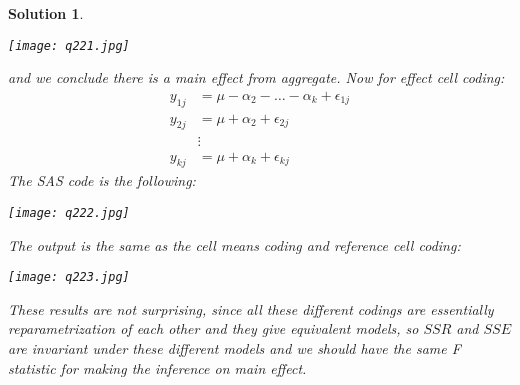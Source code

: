 \documentclass[11pt]{article}
\newtheorem{sol}{Solution}
\begin{document}
\begin{sol}
\begin{center}
		\texttt{[image: q221.jpg]}
	\end{center}
	and we conclude there is a main effect from aggregate.\vskip 2mm
	Now for effect cell coding:
	\begin{align*}
		y_{1j} &= \mu - \alpha_2 - \ldots - \alpha_k + \epsilon_{1j}\\
		y_{2j} &= \mu + \alpha_2 + \epsilon_{2j}\\
		&\vdots \\
		y_{kj} &= \mu + \alpha_k + \epsilon_{kj}
	\end{align*}
	The SAS code is the following:
	\begin{center}
		\texttt{[image: q222.jpg]}
	\end{center}
	The output is the same as the cell means coding and reference cell coding:
	\begin{center}
		\texttt{[image: q223.jpg]}
	\end{center}
	These results are not surprising, since all these different codings are essentially reparametrization of each other and they give equivalent models, so $SSR$ and $SSE$ are invariant under these different models and we should have the same F statistic for making the inference on main effect.
\end{sol}
\end{document}
